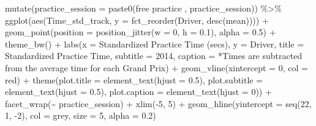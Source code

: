 \documentclass[
]{book}
\newenvironment{Shaded}{\begin{snugshade}}{\end{snugshade}}
\newcommand{\AttributeTok}[1]{\textcolor[rgb]{0.77,0.63,0.00}{#1}}
\newcommand{\DecValTok}[1]{\textcolor[rgb]{0.00,0.00,0.81}{#1}}
\newcommand{\FloatTok}[1]{\textcolor[rgb]{0.00,0.00,0.81}{#1}}
\newcommand{\FunctionTok}[1]{\textcolor[rgb]{0.00,0.00,0.00}{#1}}
\newcommand{\NormalTok}[1]{#1}
\newcommand{\SpecialCharTok}[1]{\textcolor[rgb]{0.00,0.00,0.00}{#1}}
\newcommand{\StringTok}[1]{\textcolor[rgb]{0.31,0.60,0.02}{#1}}
\begin{document}
\begin{Shaded}
\begin{Highlighting}[]
  \FunctionTok{mutate}\NormalTok{(}\AttributeTok{practice\_session =} \FunctionTok{paste0}\NormalTok{(}\StringTok{\textquotesingle{}free practice \textquotesingle{}}\NormalTok{, practice\_session)) }\SpecialCharTok{\%\textgreater{}\%}  
   \FunctionTok{ggplot}\NormalTok{(}\FunctionTok{aes}\NormalTok{(Time\_std\_track, }\AttributeTok{y =} \FunctionTok{fct\_reorder}\NormalTok{(Driver, }\FunctionTok{desc}\NormalTok{(mean)))) }\SpecialCharTok{+}
   \FunctionTok{geom\_point}\NormalTok{(}\AttributeTok{position =} \FunctionTok{position\_jitter}\NormalTok{(}\AttributeTok{w =} \DecValTok{0}\NormalTok{, }\AttributeTok{h =} \FloatTok{0.1}\NormalTok{), }\AttributeTok{alpha =} \FloatTok{0.5}\NormalTok{) }\SpecialCharTok{+}
   \FunctionTok{theme\_bw}\NormalTok{() }\SpecialCharTok{+}
   \FunctionTok{labs}\NormalTok{(}\AttributeTok{x =} \StringTok{\textquotesingle{}Standardized Practice Time (secs)\textquotesingle{}}\NormalTok{,}
        \AttributeTok{y =} \StringTok{\textquotesingle{}Driver\textquotesingle{}}\NormalTok{,}
        \AttributeTok{title =} \StringTok{\textquotesingle{}Standardized Practice Time\textquotesingle{}}\NormalTok{,}
        \AttributeTok{subtitle =} \StringTok{\textquotesingle{}2014\textquotesingle{}}\NormalTok{,}
        \AttributeTok{caption =} \StringTok{\textquotesingle{}*Times are subtracted from the average time for each Grand Prix\textquotesingle{}}\NormalTok{) }\SpecialCharTok{+}
   \FunctionTok{geom\_vline}\NormalTok{(}\AttributeTok{xintercept =} \DecValTok{0}\NormalTok{, }\AttributeTok{col =} \StringTok{\textquotesingle{}red\textquotesingle{}}\NormalTok{) }\SpecialCharTok{+}
   \FunctionTok{theme}\NormalTok{(}\AttributeTok{plot.title =} \FunctionTok{element\_text}\NormalTok{(}\AttributeTok{hjust =} \FloatTok{0.5}\NormalTok{),}
         \AttributeTok{plot.subtitle =} \FunctionTok{element\_text}\NormalTok{(}\AttributeTok{hjust =} \FloatTok{0.5}\NormalTok{),}
         \AttributeTok{plot.caption =} \FunctionTok{element\_text}\NormalTok{(}\AttributeTok{hjust =} \DecValTok{0}\NormalTok{)) }\SpecialCharTok{+}
  \FunctionTok{facet\_wrap}\NormalTok{(}\SpecialCharTok{\textasciitilde{}}\NormalTok{ practice\_session) }\SpecialCharTok{+}
  \FunctionTok{xlim}\NormalTok{(}\SpecialCharTok{{-}}\DecValTok{5}\NormalTok{, }\DecValTok{5}\NormalTok{) }\SpecialCharTok{+}
  \FunctionTok{geom\_hline}\NormalTok{(}\AttributeTok{yintercept =} \FunctionTok{seq}\NormalTok{(}\DecValTok{22}\NormalTok{, }\DecValTok{1}\NormalTok{, }\SpecialCharTok{{-}}\DecValTok{2}\NormalTok{), }\AttributeTok{col =} \StringTok{\textquotesingle{}grey\textquotesingle{}}\NormalTok{, }\AttributeTok{size =} \DecValTok{5}\NormalTok{, }\AttributeTok{alpha =}  \FloatTok{0.2}\NormalTok{)}
\end{Highlighting}
\end{Shaded}
\end{document}

